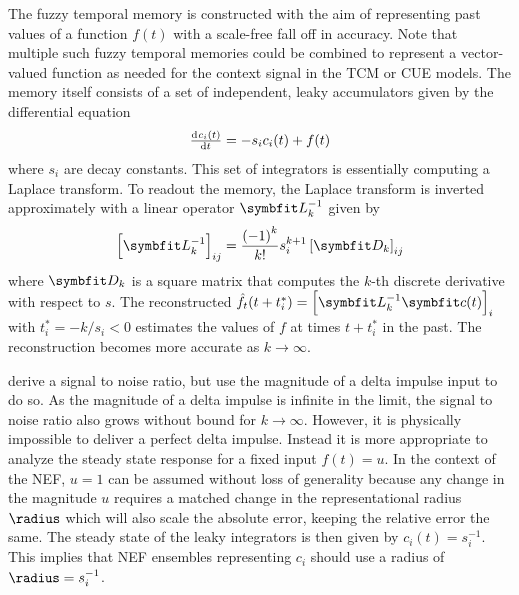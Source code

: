 The fuzzy temporal memory is constructed with the aim of representing past values of a function $f(t)$ with a scale-free fall off in accuracy.
Note that multiple such fuzzy temporal memories could be combined to represent a vector-valued function as needed for the context signal in the TCM or CUE models.
The memory itself consists of a set of independent, leaky accumulators given by the differential equation
\begin{equation}
    \od{c_i(t)}{t} = - s_i c_i(t) + f(t)
\end{equation}
where $s_i$ are decay constants.
This set of integrators is essentially computing a Laplace transform.
To readout the memory, the Laplace transform is inverted approximately with a linear operator $\mat L_k^{-1}$ given by
\begin{equation}
    \sbr{\mat L_k^{-1}}_{ij} = \frac{{(-1)}^k}{k!} s_i^{k+1} \sbr{\mat D_k}_{ij}
\end{equation}
where $\mat D_k$ is a square matrix that computes the $k$-th discrete derivative with respect to $s$.
The reconstructed $\hat{f}_t(t + t_i^*) = \sbr{\mat L_k^{-1} \vc c(t)}_i$ with $t_i^* = -k/s_i < 0$ estimates the values of $f$ at times $t + t_i^*$ in the past.
The reconstruction becomes more accurate as $k \rightarrow \infty$.

\Textcite{shankar2013} derive a signal to noise ratio, but use the magnitude of a delta impulse input to do so.
As the magnitude of a delta impulse is infinite in the limit, the signal to noise ratio also grows without bound for $k \rightarrow \infty$.
However, it is physically impossible to deliver a perfect delta impulse.
Instead it is more appropriate to analyze the steady state response for a fixed input $f(t) = u$.
In the context of the NEF, $u=1$ can be assumed without loss of generality because any change in the magnitude $u$ requires a matched change in the representational radius $\radius$ which will also scale the absolute error, keeping the relative error the same.
The steady state of the leaky integrators is then given by $c_i(t) = s_i^{-1}$.
This implies that NEF ensembles representing $c_i$ should use a radius of $\radius = s_i^{-1}$.

